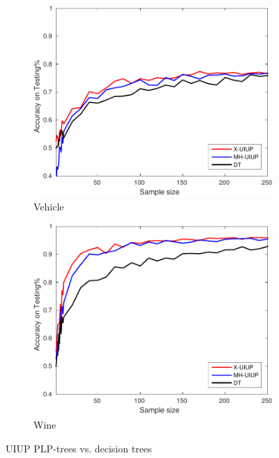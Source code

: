 \begin{figure}[ht]
\begin{subfigure}[b]{0.3\textwidth}
  	\includegraphics[width=\textwidth]{figs/PLPTF/Trees/VehicleDownsampledFurther_Trees_X_MH.pdf}
  	\caption{Vehicle}
		\label{fig:V1}
	\end{subfigure}
  \begin{subfigure}[b]{0.3\textwidth}
		\centering
  	\includegraphics[width=\textwidth]{figs/PLPTF/Trees/WineDownsampled_Trees_X_MH.pdf}
  	\caption{Wine}
		\label{fig:W1}
	\end{subfigure}

  \caption{UIUP PLP-trees vs. decision trees}
  \label{fig:trees1}
\end{figure}


